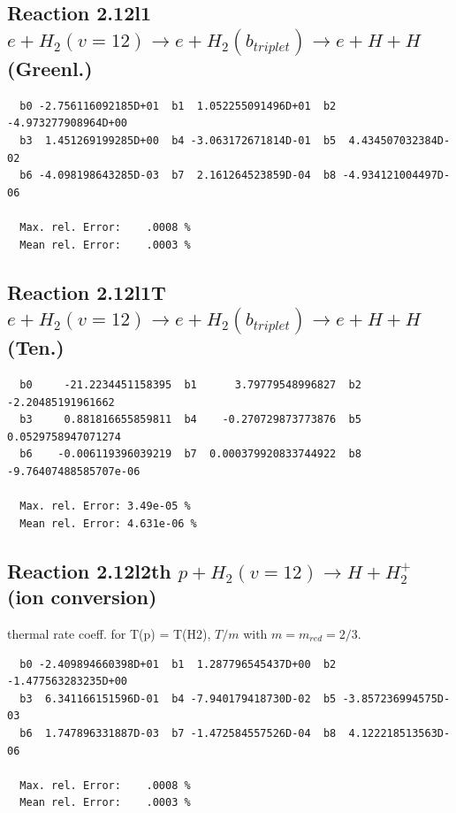 \documentclass[12pt,dvipdfmx]{article}
\begin{document}
\newpage
\subsection{
Reaction 2.12l1
$ e + H_2(v=12) \rightarrow e + H_2(b_{triplet}) \rightarrow e + H + H $ (Greenl.)
}


\begin{small}\begin{verbatim}
  b0 -2.756116092185D+01  b1  1.052255091496D+01  b2 -4.973277908964D+00
  b3  1.451269199285D+00  b4 -3.063172671814D-01  b5  4.434507032384D-02
  b6 -4.098198643285D-03  b7  2.161264523859D-04  b8 -4.934121004497D-06

  Max. rel. Error:    .0008 %
  Mean rel. Error:    .0003 %
\end{verbatim}\end{small}


\subsection{
Reaction 2.12l1T
$  e + H_2(v=12) \rightarrow e + H_2(b_{triplet})\rightarrow e + H + H $ (Ten.)
}


\begin{small}\begin{verbatim}
  b0     -21.2234451158395  b1      3.79779548996827  b2     -2.20485191961662
  b3     0.881816655859811  b4    -0.270729873773876  b5    0.0529758947071274
  b6    -0.006119396039219  b7  0.000379920833744922  b8 -9.76407488585707e-06

  Max. rel. Error: 3.49e-05 %
  Mean rel. Error: 4.631e-06 %
\end{verbatim}\end{small}

\subsection{
Reaction 2.12l2th
$ p + H_2(v=12) \rightarrow H + H_2^+$ (ion conversion)
}
thermal rate coeff. for T(p) = T(H2),
$T/m$ with $m=m_{red}=2/3$.

\begin{small}\begin{verbatim}
  b0 -2.409894660398D+01  b1  1.287796545437D+00  b2 -1.477563283235D+00
  b3  6.341166151596D-01  b4 -7.940179418730D-02  b5 -3.857236994575D-03
  b6  1.747896331887D-03  b7 -1.472584557526D-04  b8  4.122218513563D-06

  Max. rel. Error:    .0008 %
  Mean rel. Error:    .0003 %
\end{verbatim}\end{small}
\end{document}
